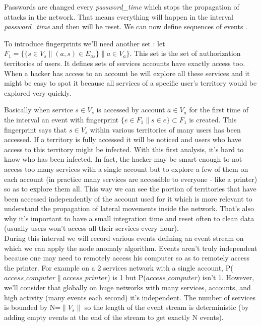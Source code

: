 \documentclass[11pt]{article}
\begin{document}
Passwords are changed every \textit{password\_time} which stops the propagation of attacks in the network. That means everything will happen in the interval \textit{password\_time} and then will be reset. We can now define sequences of events \cite{node}.

To introduce fingerprints we'll need another set : let $F_1 = \{ \{s\in V_s \| (a,s) \in E_{as}\} \| a\in V_a\}$. This set is the set of authorization territories of users. It defines sets of services accounts have exactly access too. When a hacker has access to an account he will explore all these services and it might be easy to spot it because all services of a specific user's territory would be explored very quickly.

Basically when service $s\in V_s$ is accessed by account $a\in V_a$ for the first time of the interval an event with fingerprint $\{e\in F_1 \| s \in e\}\subset F_1$ is created. This fingerprint says that $s\in V_s$ within various territories of many users has been accessed. If a territory is fully accessed it will be noticed and users who have access to this territory might be infected. With this first analysis, it's hard to know who has been infected. In fact, the hacker may be smart enough to not access too many services with a single account but to explore a few of them on each account (in practice many services are accessible to everyone - like a printer) so as to explore them all. This way we can see the portion of territories that have been accessed independently of the account used for it which is more relevant to understand the propagation of lateral movements inside the network. That's also why it's important to have a small integration time and reset often to clean data (usually users won't access all their services every hour).\\
\indent During this interval we will record various events defining an event stream on which we can apply the node anomaly algorithm. Events aren't truly independent because one may need to remotely access his computer so as to remotely access the printer. For example on a 2 services network with a single account, P($access\_computer\|access\_printer$) is 1 but P($access\_computer$) isn't 1. However, we'll consider that globally on huge networks with many services, accounts, and high activity (many events each second) it's independent. The number of services is bounded by N=$\|V_s\|$ so the length of the event stream is deterministic (by adding empty events at the end of the stream to get exactly N events).\\
\end{document}
